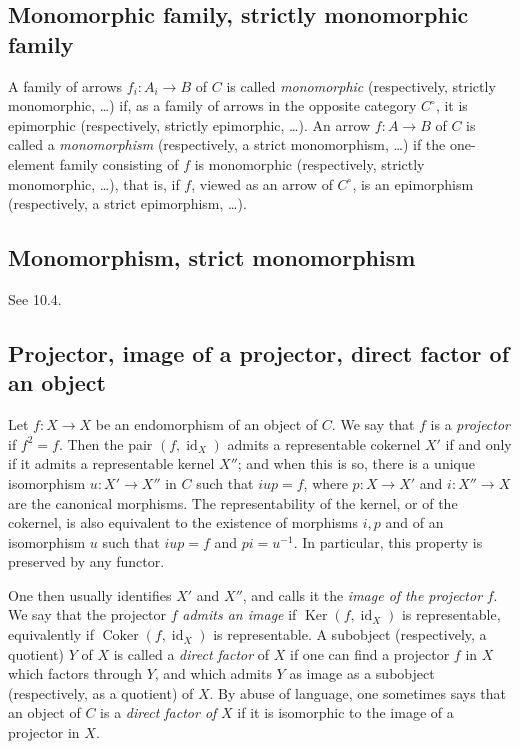 \documentclass[11pt]{article}
\newcommand{\Ker}{\operatorname{Ker}}
\newcommand{\Coker}{\operatorname{Coker}}
\newcommand{\id}{\operatorname{id}}
\begin{document}
\subsection{Monomorphic family, strictly monomorphic family}

A family of arrows \(f_i:A_i\to B\) of \(C\) is called \emph{monomorphic} (respectively, strictly monomorphic, \ldots) if, as a family of arrows in the opposite category \(C^\circ\), it is epimorphic (respectively, strictly epimorphic, \ldots). An arrow \(f:A\to B\) of \(C\) is called a \emph{monomorphism} (respectively, a strict monomorphism, \ldots) if the one-element family consisting of \(f\) is monomorphic (respectively, strictly monomorphic, \ldots), that is, if \(f\), viewed as an arrow of \(C^\circ\), is an epimorphism (respectively, a strict epimorphism, \ldots).

\subsection{Monomorphism, strict monomorphism}

See 10.4.

\subsection{Projector, image of a projector, direct factor of an object}

Let \(f:X\to X\) be an endomorphism of an object of \(C\). We say that \(f\) is a \emph{projector} if \(f^2=f\). Then the pair \((f,\id_X)\) admits a representable cokernel \(X'\) if and only if it admits a representable kernel \(X''\); and when this is so, there is a unique isomorphism \(u:X'\to X''\) in \(C\) such that \(iup=f\), where \(p:X\to X'\) and \(i:X''\to X\) are the canonical morphisms. The representability of the kernel, or of the cokernel, is also equivalent to the existence of morphisms \(i,p\) and of an isomorphism \(u\) such that \(iup=f\) and \(pi=u^{-1}\). In particular, this property is preserved by any functor.

One then usually identifies \(X'\) and \(X''\), and calls it the \emph{image of the projector} \(f\). We say that the projector \(f\) \emph{admits an image} if \(\Ker(f,\id_X)\) is representable, equivalently if \(\Coker(f,\id_X)\) is representable. A subobject (respectively, a quotient) \(Y\) of \(X\) is called a \emph{direct factor} of \(X\) if one can find a projector \(f\) in \(X\) which factors through \(Y\), and which admits \(Y\) as image as a subobject (respectively, as a quotient) of \(X\). By abuse of language, one sometimes says that an object of \(C\) is a \emph{direct factor of} \(X\) if it is isomorphic to the image of a projector in \(X\).
\end{document}
